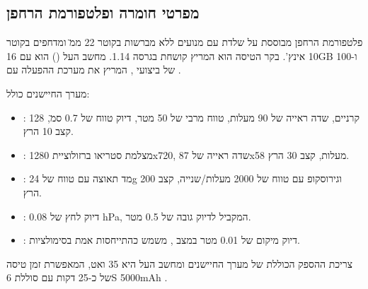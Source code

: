 \subsection{מפרטי חומרה ופלטפורמת הרחפן}
\label{sec:ch07_hardware}

פלטפורמת הרחפן מבוססת על שלדת  עם מנועים ללא מברשות בקוטר 22 מ\"מ ומדחפים בקוטר 10 אינץ'. בקר הטיסה הוא  המריץ קושחת  בגרסה 1.14. מחשב העל () הוא  עם 16GB  ו-100  של ביצועי , המריץ את מערכת ההפעלה  עם .

מערך החיישנים כולל:
\begin{itemize}
    \item {}: 128 קרניים, שדה ראייה של 90 מעלות, טווח מרבי של 50 מטר, דיוק טווח של 0.7 ס\"מ, קצב 10 הרץ.
    \item {}: מצלמת סטריאו ברזולוציית 1280x720, שדה ראייה של 87x58 מעלות, קצב 30 הרץ.
    \item {}: מד תאוצה עם טווח של 24g וגירוסקופ עם טווח של 2000 מעלות/שנייה, קצב 200 הרץ.
    \item {}: דיוק לחץ של 0.08 hPa, המקביל לדיוק גובה של 0.5 מטר.
    \item {}: דיוק מיקום של 0.01 מטר במצב , משמש כהתייחסות אמת בסימולציות.
\end{itemize}

צריכת ההספק הכוללת של מערך החיישנים ומחשב העל היא 35 ואט, המאפשרת זמן טיסה של כ-25 דקות עם סוללת 6S 5000mAh .

\begin{table}[htbp]
\centering
\caption{מפרטי חיישנים ופרמטרי רעש במערכת .}
\label{tab:ch07_sensor_specs}
\end{table}

